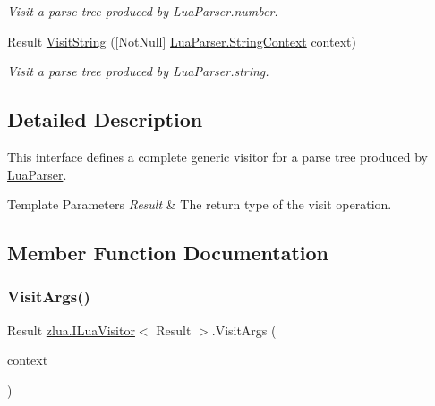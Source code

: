 \begin{DoxyCompactItemize}
\begin{DoxyCompactList}\small\item\em Visit a parse tree produced by Lua\+Parser.\+number. \end{DoxyCompactList}\item 
Result \mbox{\hyperlink{interfacezlua_1_1_i_lua_visitor_a7a2526a8d4201c1a018bf3b1e11a06c1}{Visit\+String}} (\mbox{[}Not\+Null\mbox{]} \mbox{\hyperlink{classzlua_1_1_lua_parser_1_1_string_context}{Lua\+Parser.\+String\+Context}} context)
\begin{DoxyCompactList}\small\item\em Visit a parse tree produced by Lua\+Parser.\+string. \end{DoxyCompactList}\end{DoxyCompactItemize}


\subsection{Detailed Description}
This interface defines a complete generic visitor for a parse tree produced by \mbox{\hyperlink{classzlua_1_1_lua_parser}{Lua\+Parser}}. 


\begin{DoxyTemplParams}{Template Parameters}
{\em Result} & The return type of the visit operation.\\
\hline
\end{DoxyTemplParams}


\subsection{Member Function Documentation}
\mbox{\label{interfacezlua_1_1_i_lua_visitor_afa6af1e3dc7c517b12ee24b253c6f70f}} 
\subsubsection{\texorpdfstring{Visit\+Args()}{VisitArgs()}}
{\footnotesize\ttfamily Result \mbox{\hyperlink{interfacezlua_1_1_i_lua_visitor}{zlua.\+I\+Lua\+Visitor}}$<$ Result $>$.Visit\+Args (\begin{DoxyParamCaption}\item[{\mbox{[}\+Not\+Null\mbox{]} \mbox{\hyperlink{classzlua_1_1_lua_parser_1_1_args_context}{Lua\+Parser.\+Args\+Context}}}]{context }\end{DoxyParamCaption})}



